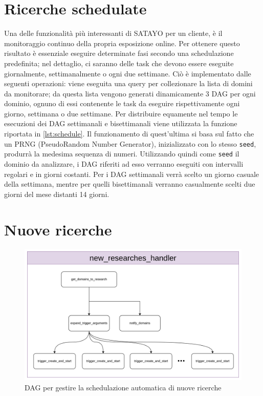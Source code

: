 

\section{Ricerche schedulate}
\label{sec:schedulate}



Una delle funzionalità più interessanti di SATAYO per un cliente, è il monitoraggio
continuo della propria esposizione online. Per ottenere questo risultato è
essenziale eseguire determinate fasi secondo una schedulazione predefinita; nel dettaglio,
ci saranno delle task che devono essere eseguite giornalmente, settimanalmente o
ogni due settimane. Ciò è implementato dalle seguenti operazioni: viene eseguita
una query per collezionare la lista di domini da monitorare; da questa lista
vengono generati dinamicamente 3 DAG per ogni dominio, ognuno di essi contenente
le task da eseguire rispettivamente ogni giorno, settimana o due settimane. Per distribuire
equamente nel tempo le esecuzioni dei DAG settimanali e bisettimanali viene utilizzata
la funzione riportata in \ref{lst:schedule}. Il funzionamento di quest'ultima si
basa sul fatto che un PRNG (PseudoRandom Number Generator)\cite{py-random},
inizializzato con lo stesso \texttt{seed}, produrrà la medesima sequenza di
numeri. Utilizzando quindi come \texttt{seed} il dominio da analizzare, i DAG riferiti
ad esso verranno eseguiti con intervalli regolari e in giorni costanti. Per i
DAG settimanali verrà scelto un giorno casuale della settimana, mentre per quelli
bisettimanali verranno casualmente scelti due giorni del mese distanti 14 giorni.

\section{Nuove ricerche}
\label{sec:nuove}

\begin{figure}[htbp]
  \centering
  \includegraphics[width=.6\linewidth]{images/new_research_handler.png}
  \caption{DAG per gestire la schedulazione automatica di nuove ricerche}
  \label{fig:new-hanlder}
\end{figure}

